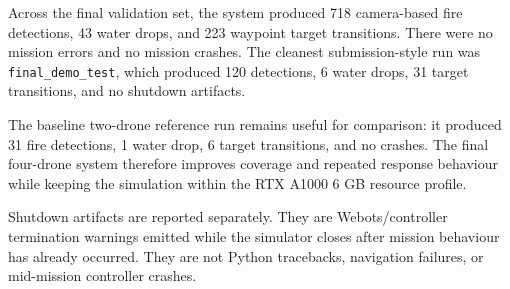 \documentclass[12pt, a4paper] {report}
\begin{document}
\begin{table}[H]
\centering
\caption{Mission performance across final four-drone validation runs.}
\small
{}
\end{table}

Across the final validation set, the system produced 718 camera-based fire detections, 43 water drops, and 223 waypoint target transitions. There were no mission errors and no mission crashes. The cleanest submission-style run was \texttt{final\_demo\_test}, which produced 120 detections, 6 water drops, 31 target transitions, and no shutdown artifacts.

The baseline two-drone reference run remains useful for comparison: it produced 31 fire detections, 1 water drop, 6 target transitions, and no crashes. The final four-drone system therefore improves coverage and repeated response behaviour while keeping the simulation within the RTX A1000 6 GB resource profile.

Shutdown artifacts are reported separately. They are Webots/controller termination warnings emitted while the simulator closes after mission behaviour has already occurred. They are not Python tracebacks, navigation failures, or mid-mission controller crashes.
\end{document}
